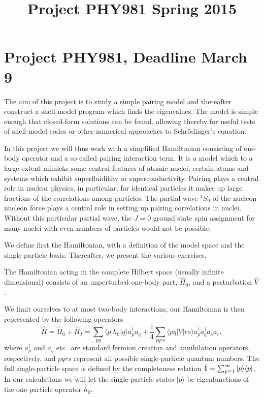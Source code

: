 \documentclass[prc]{revtex4}
\begin{document}
\title{Project PHY981 Spring 2015}
\maketitle
\section*{Project PHY981, Deadline March 9}

The aim of this project is to study a simple pairing model and thereafter construct a shell-model program which finds the eigenvalues.
The model is simple enough that closed-form solutions can be found, allowing thereby for useful tests of shell-model codes or other
numerical approaches to Schr\"odinger's equation. 

In this project we will thus work with a simplified Hamiltonian consisting of one-body operator and a so-called 
 pairing interaction term. It is a model which to a large extent mimicks some central features of
atomic nuclei, certain atoms and systems which exhibit superfluiditity or superconductivity.  
Pairing plays a central role in nuclear physics, in particular, for identical particles it makes up large fractions of the correlations among particles. The partial wave $^{1}S_0$ of the nucleon-nucleon force plays a central role in setting up pairing correlations in nuclei. Without this particular partial wave, the $J=0$ ground state spin assignment for many nuclei with even numbers of particles would not be possible. 


We define first the Hamiltonian, with a definition of the model space and
the single-particle basis. Thereafter, we present the various exercises.

The Hamiltonian acting in the complete Hilbert space (usually infinite
dimensional) consists of an unperturbed one-body part, $\hat{H}_0$,
and a perturbation $\hat{V}$. 

We limit ourselves to at most two-body interactions, our Hamiltonian  is 
then represented by the following operators
\begin{equation}
\hat{H} = \hat{H}_0 +\hat{H}_I=\sum_{pq}\langle p |h_0|q\rangle a_{p}^{\dagger}a_{q} +\frac{1}{4}\sum_{pqrs}\langle pq| V|rs\rangle a_{p}^{\dagger}a_{q}^{\dagger}a_{s}a_{r},
\label{eq:hamiltonian}
\end{equation}
where $a_{p}^{\dagger}$ and $a_{q}$ etc.~are standard fermion creation and annihilation operators, respectively,
and $pqrs$ represent all possible single-particle quantum numbers. 
The full single-particle space is defined by the completeness relation
$\hat{{\bf 1}} = \sum_{p =1}^{\infty}|p \rangle \langle p|$.
In our calculations  we will let  the single-particle states $|p\rangle$
be eigenfunctions of  the one-particle operator $\hat{h}_0$. 
\end{document}
